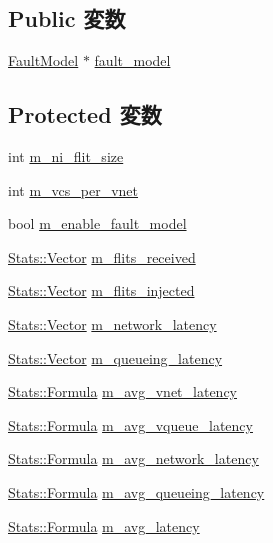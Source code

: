 \subsection*{Public 変数}
\begin{DoxyCompactItemize}
\item 
\hyperlink{classFaultModel}{FaultModel} $\ast$ \hyperlink{classBaseGarnetNetwork_abe30d3477a2645a8c875e35df4f89ba5}{fault\_\-model}
\end{DoxyCompactItemize}
\subsection*{Protected 変数}
\begin{DoxyCompactItemize}
\item 
int \hyperlink{classBaseGarnetNetwork_adab4d118df65ce10575cd726c3e764a9}{m\_\-ni\_\-flit\_\-size}
\item 
int \hyperlink{classBaseGarnetNetwork_af81627216f0e6599e8536f1aeee22abc}{m\_\-vcs\_\-per\_\-vnet}
\item 
bool \hyperlink{classBaseGarnetNetwork_a20eb28857d226eacec54dd9520fad18d}{m\_\-enable\_\-fault\_\-model}
\item 
\hyperlink{classStats_1_1Vector}{Stats::Vector} \hyperlink{classBaseGarnetNetwork_a172f90227ab341f8dc77ad9a10f46a82}{m\_\-flits\_\-received}
\item 
\hyperlink{classStats_1_1Vector}{Stats::Vector} \hyperlink{classBaseGarnetNetwork_affed0f1ee8c2bb0119bdb5b3f8796ec9}{m\_\-flits\_\-injected}
\item 
\hyperlink{classStats_1_1Vector}{Stats::Vector} \hyperlink{classBaseGarnetNetwork_a3989af812ad8dfdd0f08f6bd4a7550bc}{m\_\-network\_\-latency}
\item 
\hyperlink{classStats_1_1Vector}{Stats::Vector} \hyperlink{classBaseGarnetNetwork_a1038a746216e1aea3308b50c4b3120ed}{m\_\-queueing\_\-latency}
\item 
\hyperlink{classStats_1_1Formula}{Stats::Formula} \hyperlink{classBaseGarnetNetwork_a19df7c42a3e9d50d529b6144601b44d0}{m\_\-avg\_\-vnet\_\-latency}
\item 
\hyperlink{classStats_1_1Formula}{Stats::Formula} \hyperlink{classBaseGarnetNetwork_a6f79c9a1fdb2e07aaab27e7d2b379eef}{m\_\-avg\_\-vqueue\_\-latency}
\item 
\hyperlink{classStats_1_1Formula}{Stats::Formula} \hyperlink{classBaseGarnetNetwork_a54ab8ed8e54c5af45aa5c76804e9f9d4}{m\_\-avg\_\-network\_\-latency}
\item 
\hyperlink{classStats_1_1Formula}{Stats::Formula} \hyperlink{classBaseGarnetNetwork_afa184a7235219e14850cb9ce27ad6598}{m\_\-avg\_\-queueing\_\-latency}
\item 
\hyperlink{classStats_1_1Formula}{Stats::Formula} \hyperlink{classBaseGarnetNetwork_ad495773f32ac01393cc5b7dd9754fac9}{m\_\-avg\_\-latency}
\end{DoxyCompactItemize}


